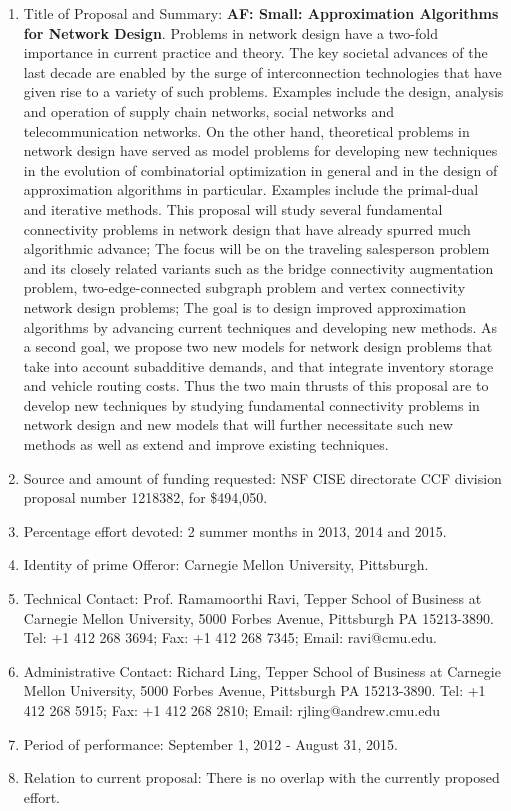 \begin{enumerate}
\item Title of Proposal and Summary: {\bf AF: Small: Approximation Algorithms for Network Design}. Problems in network design have a two-fold importance in current practice and theory. The key societal advances of the last decade are enabled by the surge of interconnection technologies that have given rise to a variety of such problems. Examples include the design, analysis and operation of supply chain networks, social networks and telecommunication networks. On the other hand, theoretical problems in network design have served as model problems for developing new techniques in the evolution of combinatorial optimization in general and in the design of approximation algorithms in particular. Examples include the primal-dual and iterative methods. This proposal will study several fundamental connectivity problems in network design that have already spurred much algorithmic advance; The focus will be on the traveling salesperson problem and its closely related variants such as the bridge connectivity augmentation problem, two-edge-connected subgraph problem and vertex connectivity network design problems; The goal is to design improved approximation algorithms by advancing current techniques and developing new methods. As a second goal, we propose two new models for network design problems that take into account subadditive demands, and that integrate inventory storage and vehicle routing costs. Thus the two main thrusts of this proposal are to develop new techniques by studying fundamental connectivity problems in network design and new models that will further necessitate such new methods as well as extend and improve existing techniques.
\item Source and amount of funding requested: NSF CISE directorate CCF division proposal number 1218382, for \$494,050.
\item Percentage effort devoted: 2 summer months in 2013, 2014 and 2015.
\item Identity of prime Offeror: Carnegie Mellon University, Pittsburgh.
\item Technical Contact: Prof. Ramamoorthi Ravi,  Tepper School of Business at
 Carnegie Mellon University,  5000 Forbes Avenue, Pittsburgh PA 15213-3890.  Tel: +1 412 268 3694;  Fax: +1 412 268 7345;  Email: ravi@cmu.edu.
\item Administrative Contact: Richard Ling, Tepper School of Business at
 Carnegie Mellon University,  5000 Forbes Avenue, Pittsburgh PA 15213-3890. Tel: +1 412 268 5915; Fax: +1 412 268 2810; Email: rjling@andrew.cmu.edu
\item  Period of performance: September 1, 2012 - August 31, 2015.
\item Relation to current proposal: There is no overlap with the currently proposed effort.
\end{enumerate}
